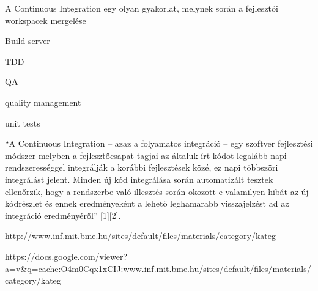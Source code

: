 A Continuous Integration egy olyan gyakorlat, melynek során a fejlesztői workspacek mergelése

Build server

TDD

QA

quality management

unit tests

“A Continuous Integration – azaz a folyamatos integráció – egy szoftver fejlesztési módszer melyben a fejlesztőcsapat tagjai az általuk írt kódot legalább napi rendszerességgel integrálják a korábbi fejlesztések közé, ez napi többszöri integrálást jelent. Minden új kód integrálása során automatizált tesztek ellenőrzik, hogy a rendszerbe való illesztés során okozott-e valamilyen hibát az új kódrészlet és ennek eredményeként a lehető leghamarabb visszajelzést ad az integráció eredményéről” [1][2].

http://www.inf.mit.bme.hu/sites/default/files/materials/category/kateg%

https://docs.google.com/viewer?a=v&q=cache:O4m0Cqx1xCIJ:www.inf.mit.bme.hu/sites/default/files/materials/category/kateg%